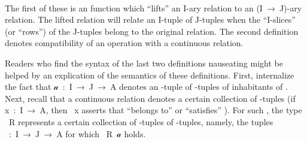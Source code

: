 \begin{code}
\AgdaSpace{}%
\AgdaSpace{}%
\AgdaSpace{}%
\AgdaSpace{}%
\<%
\\
%
\>[1]\AgdaSpace{}%
\AgdaSpace{}%
%
\>[25]\AgdaSymbol{=}\AgdaSpace{}%
\AgdaSpace{}%
\AgdaSpace{}%
\AgdaSpace{}%
\AgdaSymbol{(}\AgdaSpace{}%
\AgdaSpace{}%
\AgdaSpace{}%
\AgdaSpace{}%
\AgdaSymbol{)}\AgdaSpace{}%
\AgdaFunction{,}\AgdaSpace{}%
\AgdaSymbol{(}\AgdaSpace{}%
\AgdaSpace{}%
\AgdaSpace{}%
\AgdaSpace{}%
\AgdaSpace{}%
\AgdaSpace{}%
\AgdaSpace{}%
\AgdaSpace{}%
\AgdaSymbol{(}\AgdaSpace{}%
\AgdaSymbol{(}\AgdaSpace{}%
\AgdaSymbol{)))}\<%
\end{code}
\ccpad
 The first of these is an  function which ``lifts'' an \ab I-ary relation to an (\ab I~\as →~\ab J)-ary relation. The lifted relation will relate an \ab I-tuple of \ab J-tuples when the ``\ab I-slices'' (or ``rows'') of the \ab J-tuples belong to the original relation. The second definition denotes compatibility of an operation with a continuous relation.

Readers who find the syntax of the last two definitions nauseating might be helped by an explication of the semantics of these definitions.  First, internalize the fact that \ab 𝒶~\as :~\ab I~\as →~\ab J~\as →~\ab A denotes an -tuple of -tuples of inhabitants of . Next, recall that a continuous relation  denotes a certain collection of -tuples (if \ab x~\as :~\ab I~\as →~\ab A, then ~\ab x asserts that  ``belongs to'' or ``satisfies'' ).  For such , the type ~\ab R represents a certain collection of -tuples of -tuples, namely, the tuples ~\as :~\ab I~\as →~\ab J~\as →~\ab A for which ~\ab R~\ab 𝒶 holds.

